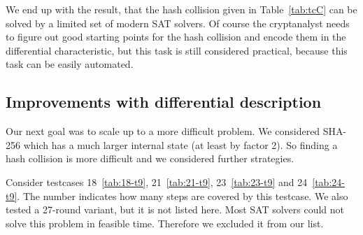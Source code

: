 We end up with the result, that the hash collision given in Table~\ref{tab:tcC}
can be solved by a limited set of modern SAT solvers. Of course the cryptanalyst
needs to figure out good starting points for the hash collision and encode them
in the differential characteristic, but this task is still considered practical,
because this task can be easily automated.

\subsection{Improvements with differential description}
\label{sec:result-diff-desc}
%
Our next goal was to scale up to a more difficult problem. We considered SHA-256
which has a much larger internal state (at least by factor 2). So finding a hash
collision is more difficult and we considered further strategies.

Consider testcases 18~\ref{tab:18-t9}, 21~\ref{tab:21-t9}, 23~\ref{tab:23-t9}
and 24~\ref{tab:24-t9}. The number indicates how many steps are covered by this
testcase. We also tested a 27-round variant, but it is not listed here.
Most SAT solvers could not solve this problem in feasible time. Therefore we
excluded it from our list.

